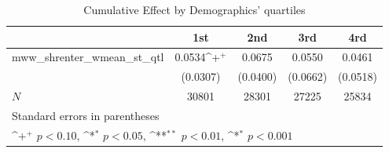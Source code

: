 \begin{table}[htbp]\centering
\def\sym#1{\ifmmode^{#1}\else\(^{#1}\)\fi}
\caption{Cumulative Effect by Demographics' quartiles}
\begin{tabular}{l*{4}{c}}
\hline\hline
            &\multicolumn{1}{c}{1st}&\multicolumn{1}{c}{2nd}&\multicolumn{1}{c}{3rd}&\multicolumn{1}{c}{4rd}\\
\hline
mww\_shrenter\_wmean\_st\_qtl&      0.0534\sym{+}&      0.0675       &      0.0550       &      0.0461       \\
            &    (0.0307)       &    (0.0400)       &    (0.0662)       &    (0.0518)       \\
\hline
\(N\)       &       30801       &       28301       &       27225       &       25834       \\
\hline\hline
\multicolumn{5}{l}{\footnotesize Standard errors in parentheses}\\
\multicolumn{5}{l}{\footnotesize \sym{+} \(p<0.10\), \sym{*} \(p<0.05\), \sym{**} \(p<0.01\), \sym{*} \(p<0.001\)}\\
\end{tabular}
\end{table}
